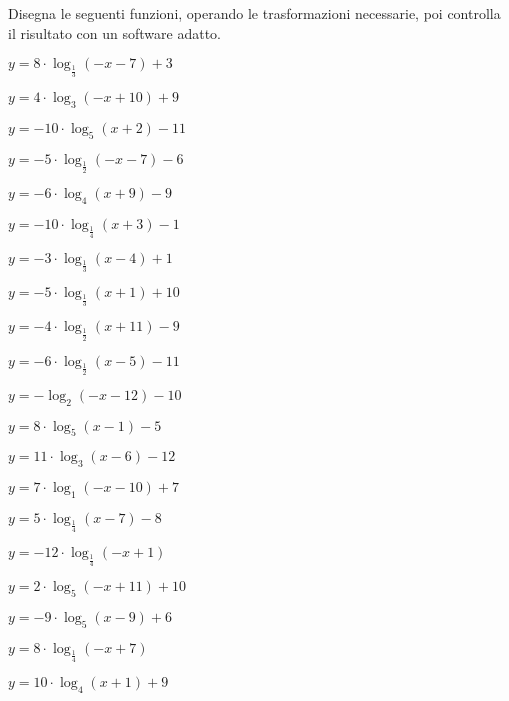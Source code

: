 \begin{esercizio}\label{ese:}
 Disegna le seguenti funzioni, operando le trasformazioni necessarie, poi 
controlla il risultato con un software adatto.
\begin{multicols}{2}
 \begin{enumeratea}
  \item  \(y=8 \cdot \log_{\frac{1}{3}}\left(-x-7\right) +3\)
  \item  \(y=4 \cdot \log_{3}\left(-x+10\right) +9\)
  \item  \(y=-10 \cdot \log_{5}\left(x+2\right) -11\)
  \item  \(y=-5 \cdot \log_{\frac{1}{2}}\left(-x-7\right) -6\)
  \item  \(y=-6 \cdot \log_{4}\left(x+9\right) -9\)
  \item  \(y=-10 \cdot \log_{\frac{1}{4}}\left(x+3\right) -1\)
  \item  \(y=-3 \cdot \log_{\frac{1}{3}}\left(x-4\right) +1\)
  \item  \(y=-5 \cdot \log_{\frac{1}{3}}\left(x+1\right) +10\)
  \item  \(y=-4 \cdot \log_{\frac{1}{2}}\left(x+11\right) -9\)
  \item  \(y=-6 \cdot \log_{\frac{1}{2}}\left(x-5\right) -11\)
  \item  \(y=- \log_{2}\left(-x-12\right) -10\)
  \item  \(y=8 \cdot \log_{5}\left(x-1\right) -5\)
  \item  \(y=11 \cdot \log_{3}\left(x-6\right) -12\)
  \item  \(y=7 \cdot \log_{1}\left(-x-10\right) +7\)
  \item  \(y=5 \cdot \log_{\frac{1}{4}}\left(x-7\right) -8\)
  \item  \(y=-12 \cdot \log_{\frac{1}{4}}\left(-x+1\right) \)
  \item  \(y=2 \cdot \log_{5}\left(-x+11\right) +10\)
  \item  \(y=-9 \cdot \log_{5}\left(x-9\right) +6\)
  \item  \(y=8 \cdot \log_{\frac{1}{4}}\left(-x+7\right) \)
  \item  \(y=10 \cdot \log_{4}\left(x+1\right) +9\)
 \end{enumeratea}
\end{multicols}
\end{esercizio}


